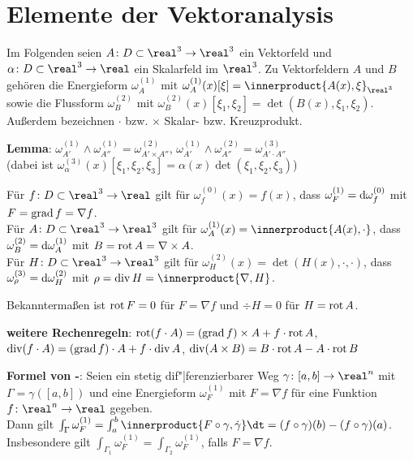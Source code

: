 \section{%
    Elemente der Vektoranalysis%
}

Im Folgenden seien $A\colon D \subset \real^3 \rightarrow \real^3$ ein
Vektorfeld und $\alpha\colon D \subset \real^3 \rightarrow \real$ ein
Skalarfeld im $\real^3$.
Zu Vektorfeldern $A$ und $B$ gehören die Energieform $\omega_A^{(1)}$ mit
$\omega_A^{(1)}(x)[\xi] = \innerproduct{A(x), \xi}_{\real^3}$ sowie
die Flussform $\omega_B^{(2)}$ mit
$\omega_B^{(2)}(x)[\xi_1, \xi_2] = \det(B(x), \xi_1, \xi_2)$.
Außerdem bezeichnen $\cdot$ bzw. $\times$ Skalar- bzw. Kreuzprodukt.

\textbf{Lemma}:
$\omega_{A'}^{(1)} \land \omega_{A''}^{(1)} = \omega_{A' \times A''}^{(2)}$,
$\omega_{A'}^{(1)} \land \omega_{A''}^{(2)} = \omega_{A' \cdot A''}^{(3)}$ \\
(dabei ist $\omega_\alpha^{(3)}(x)[\xi_1, \xi_2, \xi_3] = \alpha(x)
\det(\xi_1, \xi_2, \xi_3)$)

Für $f\colon D \subset \real^3 \rightarrow \real$ gilt
für $\omega_f^{(0)}(x) = f(x)$, dass
$\omega_F^{(1)} = \mathrm{d} \omega_f^{(0)}$ mit $F = \operatorname{grad} f = \nabla f$. \\
Für $A\colon D \subset \real^3 \rightarrow \real^3$ gilt
für $\omega_A^{(1)}(x) = \innerproduct{A(x), \cdot}$, dass
$\omega_B^{(2)} = \mathrm{d} \omega_A^{(1)}$ mit $B = \operatorname{rot} A = \nabla \times A$. \\
Für $H\colon D \subset \real^3 \rightarrow \real^3$ gilt
für $\omega_H^{(2)}(x) = \det(H(x), \cdot, \cdot)$, dass \\
$\omega_\rho^{(3)} = \mathrm{d} \omega_H^{(2)}$ mit $\rho = \div H = \innerproduct{\nabla, H}$.

Bekanntermaßen ist $\operatorname{rot} F = 0$ für $F = \nabla f$ und
$\div H = 0$ für $H = \operatorname{rot} A$.

\textbf{weitere Rechenregeln}:
$\operatorname{rot}(f \cdot A) = (\operatorname{grad} f) \times A + f \cdot \operatorname{rot} A$, \\
$\operatorname{div}(f \cdot A) = (\operatorname{grad} f) \cdot A + f \cdot \operatorname{div} A$, \qquad
$\operatorname{div}(A \times B) = B \cdot \operatorname{rot} A - A \cdot \operatorname{rot} B$

\linie
\pagebreak

\textbf{Formel von -}:
Seien ein stetig dif"|ferenzierbarer Weg
$\gamma\colon [a, b] \rightarrow \real^n$ mit $\Gamma = \gamma([a, b])$
und eine Energieform $\omega_F^{(1)}$ mit $F = \nabla f$ für eine Funktion
$f\colon \real^n \rightarrow \real$ gegeben. \\
Dann gilt $\int_\Gamma \omega_F^{(1)} =
\int_a^b \innerproduct{F \circ \gamma, \dot{\gamma}} \dt =
(f \circ \gamma)(b) - (f \circ \gamma)(a)$. \\
Insbesondere gilt $\int_{\Gamma_1} \omega_F^{(1)} =
\int_{\Gamma_2} \omega_F^{(1)}$, falls $F = \nabla f$.


